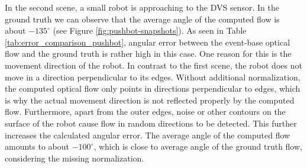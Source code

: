In the second scene, a small robot is approaching to the DVS sensor.
In the ground truth we can observe that the average angle of the computed flow is about $-135^\circ$ (see Figure \ref{fig:pushbot-snapshots}). 
As seen in Table \ref{tab:error_comparison_pushbot}, angular error between the event-base optical flow and the ground truth is rather high in this case.
One reason for this is the movement direction of the robot.
In contrast to the first scene, the robot does not move in a direction perpendicular to its edges.
Without additional normalization, the computed optical flow only points in directions perpendicular to edges, which is why the actual movement direction is not reflected properly by the computed flow.
Furthermore, apart from the outer edges, noise or other contours on the surface of the robot cause flow in random directions to be detected.
This further increases the calculated angular error.
The average angle of the computed flow amounts to about $-100^\circ$, which is close to average angle of the ground truth flow, considering the missing normalization.


